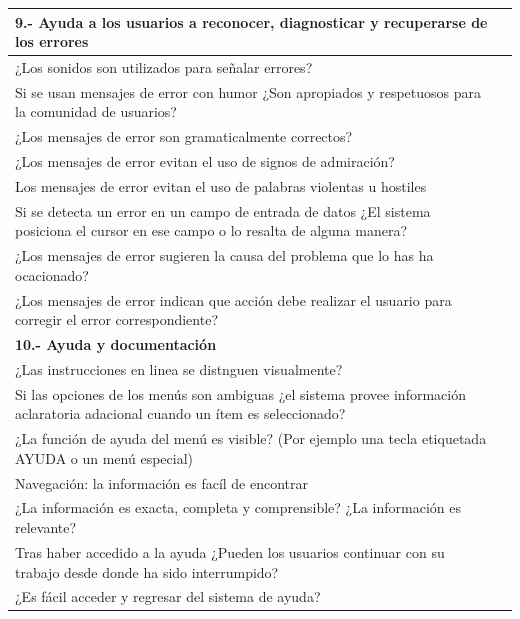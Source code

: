 \documentclass[stu, 12pt, letterpaper, donotrepeattitle, floatsintext, natbib]{apa7}
\begin{document}
\begin{longtable}{|>{\raggedright\arraybackslash}p{10cm}|>{\centering\arraybackslash}p{3cm}|}
    \textbf{9.- Ayuda a los usuarios a reconocer, diagnosticar y recuperarse de los errores} & \\ \hline
    ¿Los sonidos son utilizados para señalar errores? & \\ \hline
    Si se usan mensajes de error con humor ¿Son apropiados y respetuosos para la comunidad de usuarios? & \\ \hline
    ¿Los mensajes de error son gramaticalmente correctos? & \\ \hline
    ¿Los mensajes de error evitan el uso de signos de admiración? & \\ \hline
    Los mensajes de error evitan el uso de palabras violentas u hostiles & \\ \hline
    Si se detecta un error en un campo de entrada de datos ¿El sistema posiciona el cursor en ese campo o lo resalta de alguna manera? & \\ \hline
    ¿Los mensajes de error sugieren la causa del problema que lo has ha ocacionado? & \\ \hline
    ¿Los mensajes de error indican que acción debe realizar el usuario para corregir el error correspondiente? & \\ \hline

    \textbf{10.- Ayuda y documentación} & \\ \hline
    ¿Las instrucciones en linea se distnguen visualmente?  & \\ \hline
    Si las opciones de los menús son ambiguas ¿el sistema provee información aclaratoria adacional cuando un ítem es seleccionado? & \\ \hline
    ¿La función de ayuda del menú es visible? (Por ejemplo una tecla etiquetada AYUDA o un menú especial) & \\ \hline
    Navegación: la información es facíl de encontrar & \\ \hline
    ¿La información es exacta, completa y comprensible? ¿La información es relevante? & \\ \hline
    Tras haber accedido a la ayuda ¿Pueden los usuarios continuar con su trabajo desde donde ha sido interrumpido? & \\ \hline
    ¿Es fácil acceder y regresar del sistema de ayuda? & \\ \hline
\end{longtable}
\end{document}
